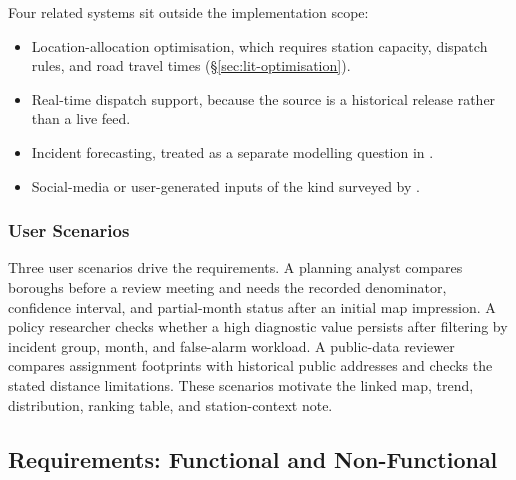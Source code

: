 Four related systems sit outside the implementation scope:

\begin{itemize}
    \item Location-allocation optimisation, which requires station capacity, dispatch rules, and road travel times (\S\ref{sec:lit-optimisation}).
    \item Real-time dispatch support, because the source is a historical release rather than a live feed.
    \item Incident forecasting, treated as a separate modelling question in \cite{predictive2024}.
    \item Social-media or user-generated inputs of the kind surveyed by \cite{imran2015, marbouti2016}.
\end{itemize}

\subsubsection{User Scenarios}
Three user scenarios drive the requirements. A planning analyst compares boroughs before a review meeting and needs the recorded denominator, confidence interval, and partial-month status after an initial map impression. A policy researcher checks whether a high diagnostic value persists after filtering by incident group, month, and false-alarm workload. A public-data reviewer compares assignment footprints with historical public addresses and checks the stated distance limitations. These scenarios motivate the linked map, trend, distribution, ranking table, and station-context note.

\subsection{Requirements: Functional and Non-Functional}

